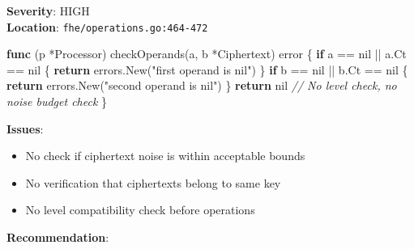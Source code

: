 \documentclass[
]{article}
\newenvironment{Shaded}{}{}
\newcommand{\CommentTok}[1]{\textcolor[rgb]{0.38,0.63,0.69}{\textit{#1}}}
\newcommand{\ControlFlowTok}[1]{\textcolor[rgb]{0.00,0.44,0.13}{\textbf{#1}}}
\newcommand{\DataTypeTok}[1]{\textcolor[rgb]{0.56,0.13,0.00}{#1}}
\newcommand{\KeywordTok}[1]{\textcolor[rgb]{0.00,0.44,0.13}{\textbf{#1}}}
\newcommand{\NormalTok}[1]{#1}
\newcommand{\OperatorTok}[1]{\textcolor[rgb]{0.40,0.40,0.40}{#1}}
\newcommand{\OtherTok}[1]{\textcolor[rgb]{0.00,0.44,0.13}{#1}}
\newcommand{\StringTok}[1]{\textcolor[rgb]{0.25,0.44,0.63}{#1}}
\providecommand{\tightlist}{%
  \setlength{\itemsep}{0pt}\setlength{\parskip}{0pt}}
\begin{document}
\textbf{Severity}: HIGH\\
\textbf{Location}: \texttt{fhe/operations.go:464-472}

\begin{Shaded}
\begin{Highlighting}[]
\KeywordTok{func} \OperatorTok{(}\NormalTok{p }\OperatorTok{*}\NormalTok{Processor}\OperatorTok{)}\NormalTok{ checkOperands}\OperatorTok{(}\NormalTok{a}\OperatorTok{,}\NormalTok{ b }\OperatorTok{*}\NormalTok{Ciphertext}\OperatorTok{)} \DataTypeTok{error} \OperatorTok{\{}
    \ControlFlowTok{if}\NormalTok{ a }\OperatorTok{==} \OtherTok{nil} \OperatorTok{||}\NormalTok{ a}\OperatorTok{.}\NormalTok{Ct }\OperatorTok{==} \OtherTok{nil} \OperatorTok{\{}
        \ControlFlowTok{return}\NormalTok{ errors}\OperatorTok{.}\NormalTok{New}\OperatorTok{(}\StringTok{"first operand is nil"}\OperatorTok{)}
    \OperatorTok{\}}
    \ControlFlowTok{if}\NormalTok{ b }\OperatorTok{==} \OtherTok{nil} \OperatorTok{||}\NormalTok{ b}\OperatorTok{.}\NormalTok{Ct }\OperatorTok{==} \OtherTok{nil} \OperatorTok{\{}
        \ControlFlowTok{return}\NormalTok{ errors}\OperatorTok{.}\NormalTok{New}\OperatorTok{(}\StringTok{"second operand is nil"}\OperatorTok{)}
    \OperatorTok{\}}
    \ControlFlowTok{return} \OtherTok{nil}  \CommentTok{// No level check, no noise budget check}
\OperatorTok{\}}
\end{Highlighting}
\end{Shaded}

\textbf{Issues}:

\begin{itemize}
\tightlist
\item
  No check if ciphertext noise is within acceptable bounds
\item
  No verification that ciphertexts belong to same key
\item
  No level compatibility check before operations
\end{itemize}

\textbf{Recommendation}:
\end{document}

